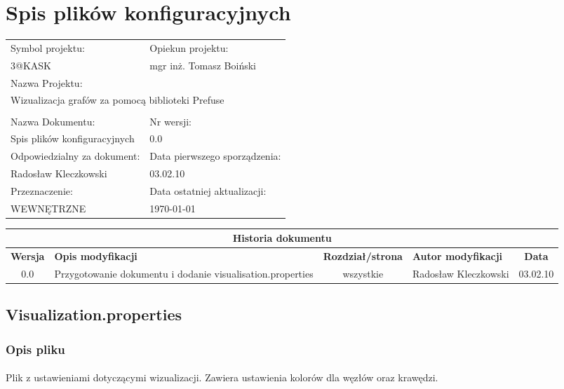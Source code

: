\section{Spis plików konfiguracyjnych}

\begin{center}
\begin{tabular}{|p{7cm}|p{7cm}|}
\hline
Symbol projektu: & Opiekun projektu:   \tabularnewline
3@KASK & mgr inż. Tomasz Boiński    \tabularnewline \hline
\multicolumn{2}{|l|}{Nazwa Projektu: } \tabularnewline
\multicolumn{2}{|l|}{Wizualizacja grafów za pomocą biblioteki Prefuse } \tabularnewline
\hline
\multicolumn{2}{l}{ } \tabularnewline %
\hline
Nazwa Dokumentu: & Nr wersji:   \tabularnewline
Spis plików konfiguracyjnych & 0.0 \tabularnewline \hline
Odpowiedzialny za dokument: & Data pierwszego sporządzenia:   \tabularnewline
Radosław Kleczkowski & 03.02.10 \tabularnewline \hline
Przeznaczenie: & Data ostatniej aktualizacji:   \tabularnewline
WEWNĘTRZNE & \today \tabularnewline \hline
\end{tabular}
\end{center}

\begin{center}
\begin{tabular}{|c|p{4cm}|c|p{3cm}|c|}
\multicolumn{5}{c}{\textbf{Historia dokumentu}} \tabularnewline \hline
\textbf{Wersja} & \textbf{Opis modyfikacji} & \textbf{Rozdział/strona} & \textbf{Autor modyfikacji} & \textbf{Data} \tabularnewline \hline
0.0 & Przygotowanie dokumentu i dodanie visualisation.properties & wszystkie & Radosław Kleczkowski & 03.02.10 \tabularnewline \hline
\end{tabular}


\end{center}
\newpage

\subsection{Visualization.properties}

\subsubsection{Opis pliku}
\paragraph{} Plik z ustawieniami dotyczącymi wizualizacji. Zawiera ustawienia kolorów dla węzłów oraz krawędzi.

